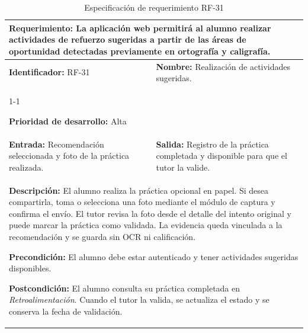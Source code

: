 \begin{longtable}{|p{7cm}|p{8cm}|}
    \caption{Especificación de requerimiento RF-31}
    \label{tab:rf31} \\ \hline
    
    \multicolumn{2}{|p{15cm}|}{\textbf{Requerimiento:} La aplicación web permitirá al alumno realizar actividades de refuerzo sugeridas a partir de las áreas de oportunidad detectadas previamente en ortografía y caligrafía.} \\ \hline
    
    \textbf{Identificador:} RF-31 &
    \textbf{Nombre:} Realización de actividades sugeridas. \\ \cline{1-1}
    
    \textbf{Prioridad de desarrollo:} Alta &
    \multicolumn{1}{p{8cm}|}{} \\ \hline
    
    \textbf{Entrada:} Recomendación seleccionada y foto de la práctica realizada. &
    \textbf{Salida:} Registro de la práctica completada y disponible para que el tutor la valide. \\ \hline
    
    \multicolumn{2}{|p{15cm}|}{
    \textbf{Descripción:} El alumno realiza la práctica opcional en papel. Si desea compartirla, toma o selecciona una foto mediante el módulo de captura y confirma el envío. El tutor revisa la foto desde el detalle del intento original y puede marcar la práctica como validada. La evidencia queda vinculada a la recomendación y se guarda sin OCR ni calificación.
    
    \vspace{0.2cm}
    \textbf{Precondición:} El alumno debe estar autenticado y tener actividades sugeridas disponibles.
    
    \vspace{0.2cm}
    \textbf{Postcondición:} El alumno consulta su práctica completada en \textit{Retroalimentación}. Cuando el tutor la valida, se actualiza el estado y se conserva la fecha de validación.
    } \\ \hline

\end{longtable}


